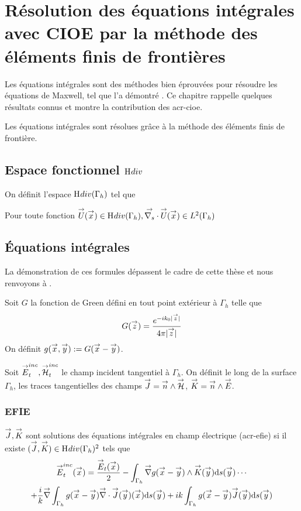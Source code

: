 \section{Résolution des équations intégrales avec CIOE par la méthode des éléments finis de frontières}

  Les équations intégrales sont des méthodes bien éprouvées pour résoudre les équations de Maxwell, tel que l'a démontré \cite{nedelec_acoustic_2001}. Ce chapitre rappelle quelques résultats connus et montre la contribution des \gls{acr-cioe}.

  Les équations intégrales sont résolues grâce à la méthode des éléments finis de frontière.

  \subsection[Espace fonctionnel Hdiv]{Espace fonctionnel \(\mathrm{H}_\mathrm{{}}{div}\)}
    On définit l'espace \(\mathrm{H}_\mathrm{{}}{div}(\Gamma_h)\) tel que
    \begin{defn}
      Pour toute fonction \({\overset{\rightarrow}{U}}({\overset{\rightarrow}{x}}) \in \mathrm{H}_\mathrm{{}}{div}(\Gamma_h), {\overset{\rightarrow}{\nabla_s}} \cdot{\overset{\rightarrow}{U}}({\overset{\rightarrow}{x}}) \in L^2(\Gamma_h)\)
    \end{defn}

  \subsection{Équations intégrales}

      La démonstration de ces formules dépassent le cadre de cette thèse et nous renvoyons à \cite[\textsection~5.6]{nedelec_mixed_1980}.

      Soit \(G\) la fonction de Green défini en tout point extérieur à \(\Gamma_h\) telle que
      \begin{equation}
        G({\overset{\rightarrow}{z}}) = \dfrac{e^{-ik_0|{\overset{\rightarrow}{z}}|}}{4\pi|{\overset{\rightarrow}{z}}|}
      \end{equation}
      On définit \(g({\overset{\rightarrow}{x}},{\overset{\rightarrow}{y}}) := G({\overset{\rightarrow}{x}} - {\overset{\rightarrow}{y}})\).

      Soit \({\overset{\rightarrow}{E}}^{inc}_t,{\overset{\rightarrow}{\mathcal{H}}}^{inc}_t\) le champ incident tangentiel à \(\Gamma_h\). On définit le long de la surface \(\Gamma_h\), les traces tangentielles des champs \({\overset{\rightarrow}{J}} = {\overset{\rightarrow}{n}} \wedge {\overset{\rightarrow}{\mathcal{H}}}\), \({\overset{\rightarrow}{K}} = {\overset{\rightarrow}{n}} \wedge {\overset{\rightarrow}{E}}\).

      \subsubsection{EFIE}

        \begin{defn}
          \({\overset{\rightarrow}{J}},{\overset{\rightarrow}{K}}\) sont solutions des équations intégrales en champ électrique (\gls{acr-efie}) si il existe \(({\overset{\rightarrow}{J}},{\overset{\rightarrow}{K}}) \in \mathrm{H}_\mathrm{{}}{div}(\Gamma_h)^2\) tels que
          \begin{multline}
            \label{eq:form_int:EFIE}
            \vE^{inc}_t(\vx) =
              \frac{\vE_t(\vx)}{2}
                - \int_{\Gamma_h} \vgrad g(\vx - \vy) \pvect \vK(\vy) \dd{s}(\vy) \cdots \\
              + \frac{i}{k}\vgrad \int_{\Gamma_h}  g(\vx - \vy)\vdiv\vJ(\vy)(\vx) \dd{s}(\vy)
                +  ik\int_{\Gamma_h} g(\vx - \vy)\vJ(\vy) \dd{s}(\vy)
          \end{multline}
        \end{defn}


